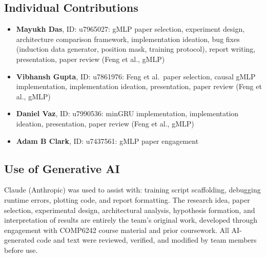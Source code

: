 \documentclass[10pt,a4paper]{article}
\begin{document}
\subsection*{Individual Contributions}
\begin{itemize}
    \item \textbf{Mayukh Das}, ID: u7965027: gMLP paper selection, experiment design, architecture comparison framework, implementation ideation, bug fixes (induction data generator, position mask, training protocol), report writing, presentation, paper review (Feng et al., gMLP)
    \item \textbf{Vibhansh Gupta}, ID: u7861976: Feng et al.\ paper selection, causal gMLP implementation, implementation ideation, presentation, paper review (Feng et al., gMLP)
    \item \textbf{Daniel Vaz}, ID: u7990536: minGRU implementation, implementation ideation, presentation, paper review (Feng et al., gMLP)
    \item \textbf{Adam B Clark}, ID: u7437561: gMLP paper engagement
\end{itemize}

\subsection*{Use of Generative AI}
Claude (Anthropic) was used to assist with: training script scaffolding, debugging runtime errors, plotting code, and report formatting. The research idea, paper selection, experimental design, architectural analysis, hypothesis formation, and interpretation of results are entirely the team's original work, developed through engagement with COMP6242 course material and prior coursework. All AI-generated code and text were reviewed, verified, and modified by team members before use.
\end{document}
